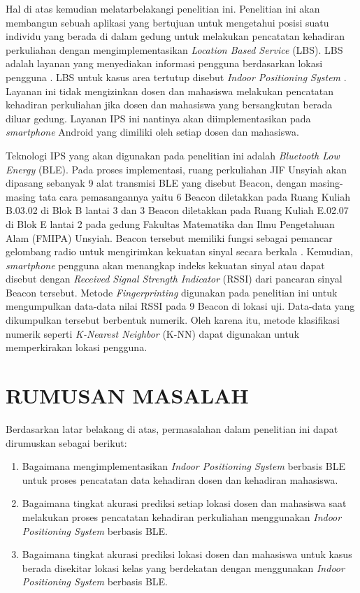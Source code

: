 \par Hal di atas kemudian melatarbelakangi penelitian ini. Penelitian ini akan membangun sebuah aplikasi yang bertujuan untuk mengetahui posisi suatu individu yang berada di dalam gedung untuk melakukan pencatatan kehadiran perkuliahan dengan mengimplementasikan \textit{Location Based Service} (LBS). LBS adalah layanan yang menyediakan informasi pengguna berdasarkan lokasi pengguna \citep{Virrantaus2001}. LBS untuk kasus area tertutup disebut \textit{Indoor Positioning System} \citep{brena2017}. Layanan ini tidak mengizinkan dosen dan mahasiswa melakukan pencatatan kehadiran perkuliahan jika dosen dan mahasiswa yang bersangkutan berada diluar gedung. Layanan IPS ini nantinya akan diimplementasikan pada \textit{smartphone} Android yang dimiliki oleh setiap dosen dan mahasiswa.

\par Teknologi IPS yang akan digunakan pada penelitian ini adalah \textit{Bluetooth Low Energy} (BLE). Pada proses implementasi, ruang perkuliahan JIF Unsyiah akan dipasang sebanyak 9 alat transmisi BLE yang disebut Beacon, dengan masing-masing tata cara pemasangannya yaitu 6 Beacon diletakkan pada Ruang Kuliah B.03.02 di Blok B lantai 3 dan 3 Beacon diletakkan pada Ruang Kuliah  E.02.07 di Blok E lantai 2 pada gedung Fakultas Matematika dan Ilmu Pengetahuan Alam (FMIPA) Unsyiah. Beacon tersebut memiliki fungsi sebagai pemancar gelombang radio untuk mengirimkan kekuatan sinyal secara berkala \citep{Noguchi2015}. Kemudian, \textit{smartphone} pengguna akan menangkap indeks kekuatan sinyal atau dapat disebut dengan \textit{Received Signal Strength Indicator} (RSSI) dari pancaran sinyal Beacon tersebut. Metode \textit{Fingerprinting} digunakan pada penelitian ini untuk mengumpulkan data-data nilai RSSI pada 9 Beacon di lokasi uji. Data-data yang dikumpulkan tersebut berbentuk numerik. Oleh karena itu, metode klasifikasi numerik seperti \textit{K-Nearest Neighbor} (K-NN) dapat digunakan untuk memperkirakan lokasi pengguna.

\fancyhf{} 
\fancyfoot[R]{\thepage}

\section{\uppercase{RUMUSAN MASALAH}}
Berdasarkan latar belakang di atas, permasalahan dalam penelitian ini dapat dirumuskan sebagai berikut:
\begin{enumerate}
	\item Bagaimana mengimplementasikan \textit{Indoor Positioning System} berbasis BLE untuk proses pencatatan data kehadiran dosen dan kehadiran mahasiswa. 
	\item Bagaimana tingkat akurasi prediksi setiap lokasi dosen dan mahasiswa saat melakukan proses pencatatan kehadiran perkuliahan menggunakan \textit{Indoor Positioning System} berbasis BLE.
	\item Bagaimana tingkat akurasi prediksi lokasi dosen dan mahasiswa untuk kasus berada disekitar lokasi kelas yang berdekatan dengan menggunakan \textit{Indoor Positioning System} berbasis BLE.
\end{enumerate}

